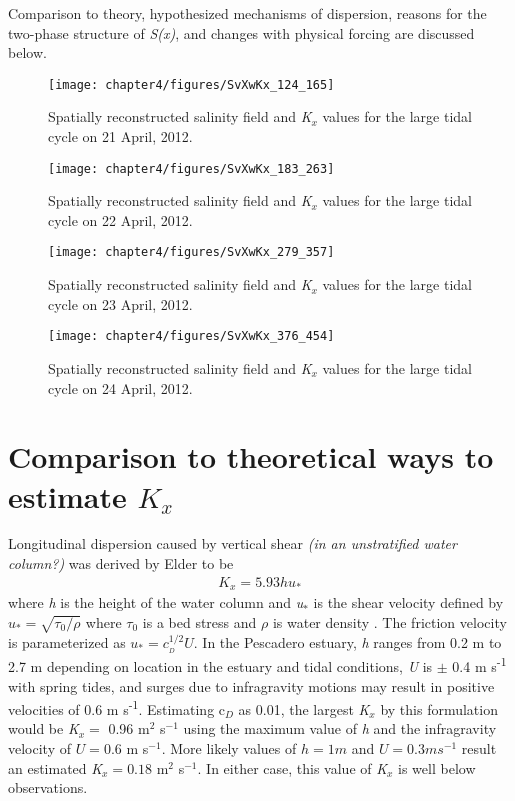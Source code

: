 Comparison to theory, hypothesized mechanisms of dispersion, reasons for the two-phase structure of \emph{S(x)}, and changes with physical forcing are discussed below. 
\begin{figure}[hp]
\centering
	\texttt{[image: chapter4/figures/SvXwKx\_124\_165]} 
\caption{Spatially reconstructed salinity field and \emph{K$_x$} values for the large tidal cycle on 21 April, 2012. } \label{fig:Kx421}
\end{figure}

\begin{figure}[hp]
\centering
	\texttt{[image: chapter4/figures/SvXwKx\_183\_263]} 
\caption{Spatially reconstructed salinity field and \emph{K$_x$} values for the large tidal cycle on 22 April, 2012. } \label{fig:Kx422}
\end{figure}

\begin{figure}[hp]
\centering
	\texttt{[image: chapter4/figures/SvXwKx\_279\_357]} 
\caption{Spatially reconstructed salinity field and \emph{K$_x$} values for the large tidal cycle on 23 April, 2012. } \label{fig:Kx423}
\end{figure}

\begin{figure}[hp]
\centering
	\texttt{[image: chapter4/figures/SvXwKx\_376\_454]} 
\caption{Spatially reconstructed salinity field and \emph{K$_x$} values for the large tidal cycle on 24 April, 2012.} \label{fig:Kx424}
\end{figure}




\section{Comparison to theoretical ways to estimate $K_x$}

Longitudinal dispersion caused by vertical shear \emph{(in an unstratified water column?)} was derived by Elder to be
\begin{eqnarray}
K_x = 5.93hu_* \label{eq:Kshear}
\end{eqnarray}
where \emph{h} is the height of the water column and \emph{u$_*$} is the shear velocity defined by $u_*=\sqrt{\tau_0/\rho}$ where $\tau_0$ is a bed stress and $\rho$ is water density \parencite*{elder_dispersion_1959}. The friction velocity is parameterized as $u_* = c_{_D}^{1/2}U$. In the Pescadero estuary, \emph{h} ranges from 0.2 m to 2.7 m depending on location in the estuary and tidal conditions, \emph{U} is $\pm$ 0.4 m s\textsuperscript{-1} with spring tides, and surges due to infragravity motions may result in positive velocities of 0.6 m s\textsuperscript{-1}. Estimating c$_D$ as 0.01, the largest \emph{K$_x$} by this formulation would be \emph{K}$_x =$ 0.96 m$^2$ s$^{-1}$ using the maximum value of \emph{h} and the infragravity velocity of $U = 0.6$ m s$^{-1}$. More likely values of $h = 1 m$ and $U = 0.3 m s^{-1}$ result an estimated \emph{K}$_x = 0.18$ m$^2$ s$^{-1}$. In either case, this value of \emph{K$_x$} is well below observations.

